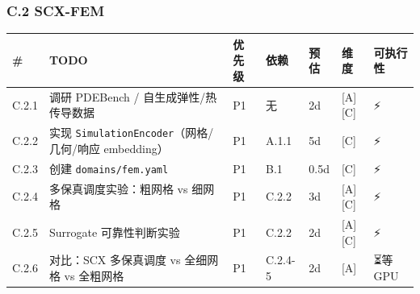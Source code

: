 \documentclass[
  12pt,
]{ctexart}
\begin{document}
\subsubsection{C.2 SCX-FEM}\label{c.2-scx-fem}

\begin{longtable}[]{@{}
  >{\raggedright\arraybackslash}p{}
  >{\raggedright\arraybackslash}p{}
  >{\raggedright\arraybackslash}p{}
  >{\raggedright\arraybackslash}p{}
  >{\raggedright\arraybackslash}p{}
  >{\raggedright\arraybackslash}p{}
  >{\raggedright\arraybackslash}p{}@{}}
\toprule\noalign{}
\begin{minipage}[b]{\linewidth}\raggedright
\#
\end{minipage} & \begin{minipage}[b]{\linewidth}\raggedright
TODO
\end{minipage} & \begin{minipage}[b]{\linewidth}\raggedright
优先级
\end{minipage} & \begin{minipage}[b]{\linewidth}\raggedright
依赖
\end{minipage} & \begin{minipage}[b]{\linewidth}\raggedright
预估
\end{minipage} & \begin{minipage}[b]{\linewidth}\raggedright
维度
\end{minipage} & \begin{minipage}[b]{\linewidth}\raggedright
可执行性
\end{minipage} \\
\midrule\noalign{}
\endhead
\bottomrule\noalign{}
\endlastfoot
C.2.1 & 调研 PDEBench / 自生成弹性/热传导数据 & P1 & 无 & 2d &
{[}A{]}{[}C{]} & ⚡ \\
C.2.2 & 实现 \texttt{SimulationEncoder}（网格/几何/响应 embedding） & P1
& A.1.1 & 5d & {[}C{]} & ⚡ \\
C.2.3 & 创建 \texttt{domains/fem.yaml} & P1 & B.1 & 0.5d & {[}C{]} &
⚡ \\
C.2.4 & 多保真调度实验：粗网格 vs 细网格 & P1 & C.2.2 & 3d &
{[}A{]}{[}C{]} & ⚡ \\
C.2.5 & Surrogate 可靠性判断实验 & P1 & C.2.2 & 2d & {[}A{]}{[}C{]} &
⚡ \\
C.2.6 & 对比：SCX 多保真调度 vs 全细网格 vs 全粗网格 & P1 & C.2.4-5 & 2d
& {[}A{]} & ⏳等 GPU \\
\end{longtable}
\end{document}
